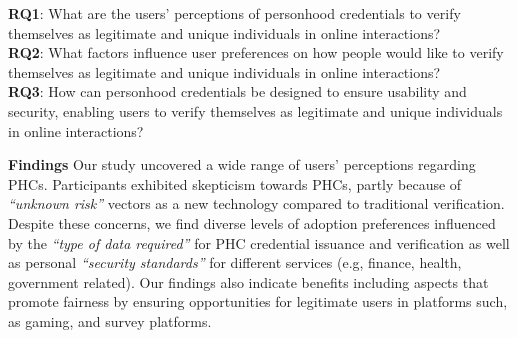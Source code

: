 \vspace{-4pt}
\begin{tcolorbox}
\textbf{RQ1}: What are the users' perceptions of personhood credentials to verify themselves as legitimate and unique individuals in online interactions?\\
\textbf{RQ2}:  What factors influence user preferences 
on how people would like to verify themselves as legitimate and unique individuals in online interactions?\\
\textbf{RQ3}: How can personhood credentials be designed to ensure usability and security, enabling users to verify themselves as legitimate and unique individuals in online interactions?
\end{tcolorbox}
\vspace{5pt}
\textbf{Findings} Our study uncovered a wide range of users' perceptions regarding PHCs. 
Participants exhibited skepticism towards PHCs, partly because of \textit{``unknown risk''} vectors as a new technology compared to traditional verification. 
Despite these concerns, we find diverse levels of adoption preferences influenced by the \textit{``type of data required''} for PHC credential issuance and verification as well as personal \textit{``security standards''} for different services (e.g, finance, health, government related). 
Our findings also indicate benefits including aspects that promote fairness by ensuring opportunities for legitimate users in platforms such, as gaming, and survey platforms.
